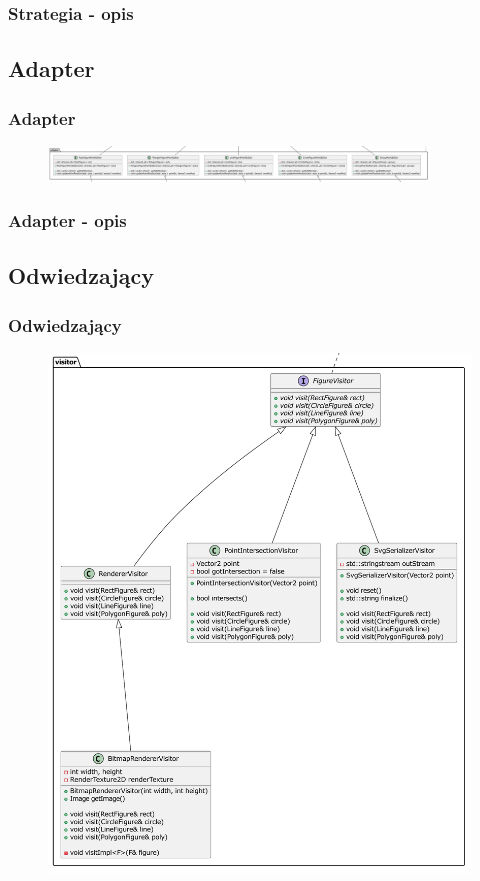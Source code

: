 \documentclass[
	11pt,]{beamer}
\begin{document}
\begin{frame}
	\frametitle{Strategia - opis}
	
\end{frame}

\subsection{Adapter}

\begin{frame}
	\frametitle{Adapter}
	
	\begin{figure}
		\includegraphics[width=0.9\textwidth]{figures/adapter.pdf}
	\end{figure}
\end{frame}

\begin{frame}
	\frametitle{Adapter - opis}
	
\end{frame}

\subsection{Odwiedzający}

\begin{frame}
	\frametitle{Odwiedzający}
	
	\begin{figure}
		\includegraphics[height=0.7\textheight]{figures/visitor.pdf}
	\end{figure}
\end{frame}
\end{document}
